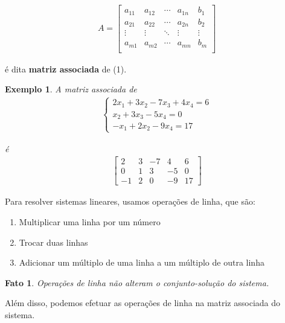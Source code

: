 \documentclass{article}
\newtheorem*{fact}{Fato}
\newtheorem*{example}{Exemplo}
\begin{document}
\begin{align*}
A = \begin{bmatrix}
 		a_{11} & a_{12} & \cdots & a_{1n} & b_1 \\
 		a_{21} & a_{22} & \cdots & a_{2n} & b_2 \\
 		\vdots & \vdots & \ddots & \vdots & \vdots \\
 		a_{m1} & a_{m2} & \cdots & a_{mn} & b_m \\
	\end{bmatrix}
\end{align*}
\par\vspace{0.3cm} é dita \textbf{matriz associada} de (1).
\begin{example}
	A matriz associada de
	\begin{align*}
		\begin{cases} 
			2x_1 + 3x_2 - 7x_3 + 4x_4 = 6 \\
			x_2 + 3x_3 - 5x_4 = 0 \\
			-x_1 + 2x_2 - 9x_4 = 17
		\end{cases}
	\end{align*}
\par\vspace{0.3cm} é 
\begin{align*}
	\begin{bmatrix}
		2 & 3 & -7 & 4 & 6 \\
		0 & 1 & 3 & -5 & 0 \\
		-1 & 2 & 0 & -9 & 17
	\end{bmatrix}
\end{align*}	
\end{example}

\par\vspace{0.3cm} Para resolver sistemas lineares, usamos operações de linha, que são:
\begin{enumerate}
	\item Multiplicar uma linha por um número
	\item Trocar duas linhas
	\item Adicionar um múltiplo de uma linha a um múltiplo de outra linha
\end{enumerate}

\begin{fact}
	Operações de linha não alteram o conjunto-solução do sistema.
\end{fact}
\par\vspace{0.3cm} Além disso, podemos efetuar as operações de linha na matriz associada do sistema.
\end{document}
